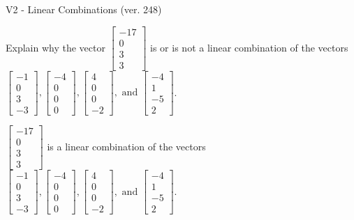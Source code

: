 \begin{exercise}
  \begin{exerciseTitle}V2 - Linear Combinations (ver. 248)\end{exerciseTitle}
  \begin{exerciseStatement}
    Explain why the vector \(\left[\begin{array}{c}
-17 \\
0 \\
3 \\
3
\end{array}\right]\)  is or is not a linear 
	combination of the vectors \(\left[\begin{array}{c}
-1 \\
0 \\
3 \\
-3
\end{array}\right] , \left[\begin{array}{c}
-4 \\
0 \\
0 \\
0
\end{array}\right] , \left[\begin{array}{c}
4 \\
0 \\
0 \\
-2
\end{array}\right] , \text{ and } \left[\begin{array}{c}
-4 \\
1 \\
-5 \\
2
\end{array}\right]\).
	


  \end{exerciseStatement}
  \begin{exerciseAnswer}
   \(\left[\begin{array}{c}
-17 \\
0 \\
3 \\
3
\end{array}\right]\) 
  	 is  
	a linear combination of the vectors \(\left[\begin{array}{c}
-1 \\
0 \\
3 \\
-3
\end{array}\right] , \left[\begin{array}{c}
-4 \\
0 \\
0 \\
0
\end{array}\right] , \left[\begin{array}{c}
4 \\
0 \\
0 \\
-2
\end{array}\right] , \text{ and } \left[\begin{array}{c}
-4 \\
1 \\
-5 \\
2
\end{array}\right]\).


\end{exerciseAnswer}
\end{exercise}
